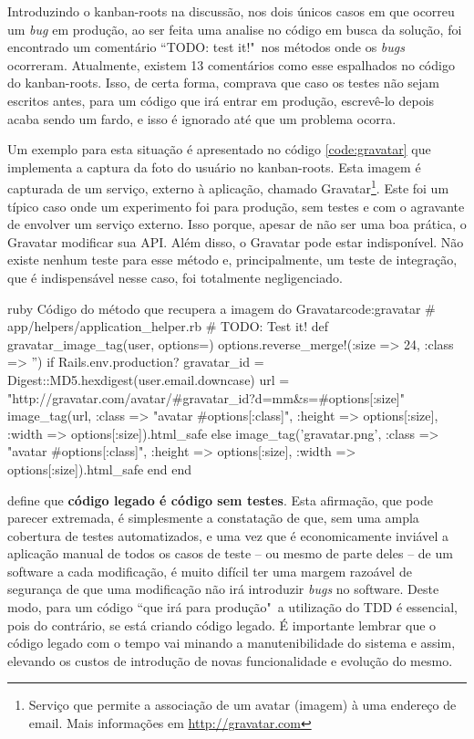 Introduzindo o kanban-roots na discussão, nos dois únicos casos em que ocorreu um \textit{bug} em produção, ao ser feita uma analise no código em busca da solução, foi encontrado um comentário ``TODO: test it!"\ nos métodos onde os \textit{bugs} ocorreram. Atualmente, existem 13 comentários como esse espalhados no código do kanban-roots. Isso, de certa forma, comprava que caso os testes não sejam escritos antes, para um código que irá entrar em produção, escrevê-lo depois acaba sendo um fardo, e isso é ignorado até que um problema ocorra.

Um exemplo para esta situação é apresentado no código \ref{code:gravatar} que implementa a captura da foto do usuário no kanban-roots. Esta imagem é capturada de um serviço, externo à aplicação, chamado Gravatar\footnote{Serviço que permite a associação de um avatar (imagem) à uma endereço de email. Mais informações em \url{http://gravatar.com}}. Este foi um típico caso onde um experimento foi para produção, sem testes e com o agravante de envolver um serviço externo. Isso porque, apesar de não ser uma boa prática, o Gravatar modificar sua API. Além disso, o Gravatar pode estar indisponível. Não existe nenhum teste para esse método e, principalmente, um teste de integração, que é indispensável nesse caso, foi totalmente negligenciado.

\begin{mycode}{ruby}%
{Código do método que recupera a imagem do Gravatar}{code:gravatar}
# app/helpers/application_helper.rb
# TODO: Test it!
def gravatar_image_tag(user, options={})
  options.reverse_merge!(:size => 24, :class => '')
  if Rails.env.production?
    gravatar_id = Digest::MD5.hexdigest(user.email.downcase)
    url = "http://gravatar.com/avatar/#{gravatar_id}?d=mm&s=#{options[:size]}"
    image_tag(url,
              :class => "avatar #{options[:class]}",
              :height => options[:size],
              :width => options[:size]).html_safe
  else
    image_tag('gravatar.png',
              :class => "avatar #{options[:class]}",
              :height => options[:size],
              :width => options[:size]).html_safe
  end
end
\end{mycode}

 define que \textbf{código legado é código sem testes}. Esta afirmação, que pode parecer extremada, é simplesmente a constatação de que, sem uma ampla cobertura de testes automatizados, e uma vez que é economicamente inviável a aplicação manual de todos os casos de teste – ou mesmo de parte deles – de um software a cada modificação, é muito difícil ter uma margem razoável de segurança de que uma modificação não irá introduzir \textit{bugs} no software. Deste modo, para um código ``que irá para produção"\ a utilização do TDD é essencial, pois do contrário, se está criando código legado. É importante lembrar que o código legado com o tempo vai minando a manutenibilidade do sistema e assim, elevando os custos de introdução de novas funcionalidade e evolução do mesmo.

